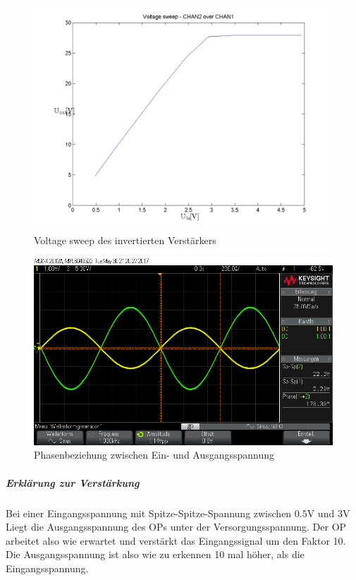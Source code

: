 \documentclass[10pt]{scrreprt}
\begin{document}
    \begin{center}
        \begin{figure}[H]
            \includegraphics[width=\textwidth]{VS521_voltagesweep.jpg}
            \caption{Voltage sweep des invertierten Verstärkers}
        \end{figure}
        \begin{figure}[H]
            \includegraphics[width=\textwidth]{scope_5.png}
            \caption{Phasenbeziehung zwischen Ein- und Ausgangsspannung}
            \label{fig:Phasenbez}
        \end{figure}
    \end{center}

    \subparagraph{Erklärung zur Verstärkung}
    Bei einer Eingangsspannung mit Spitze-Spitze-Spannung zwischen $0.5\si{\volt}$
    und $3\si{\volt}$ Liegt die Ausgangsspannung des OPs unter der Versorgungsspannung.
    Der OP arbeitet also wie erwartet und verstärkt das Eingangssignal um den Faktor 10.
    Die Ausgangsspannung ist also wie zu erkennen 10 mal höher, als die Eingangsspannung.
\end{document}
